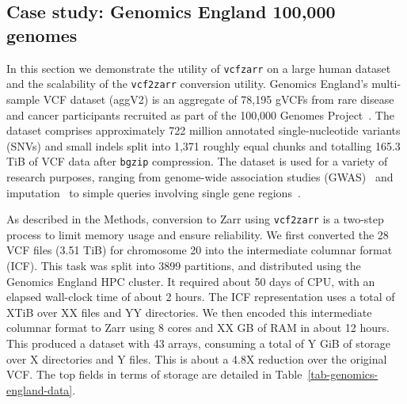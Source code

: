 \documentclass[a4paper,num-refs]{oup-contemporary}
\begin{document}
\subsection{Case study: Genomics England 100,000 genomes}
In this section we demonstrate the utility of \texttt{vcfzarr} on a large human dataset
and the scalability of the \texttt{vcf2zarr} conversion utility.
Genomics England’s multi-sample VCF dataset (aggV2) is an 
aggregate of 78,195 gVCFs from rare disease and cancer participants 
recruited as part of the 100,000 Genomes Project~\cite{turnbull2018100}. 
The dataset comprises approximately 722 million annotated single-nucleotide 
variants (SNVs) and small indels split into 1,371 roughly equal chunks and 
totalling 165.3 TiB of VCF data after \texttt{bgzip} compression. 
The dataset is used for a variety of research purposes, ranging from 
genome-wide association studies (GWAS)~\cite{kousathanas2022whole} and 
imputation~\cite{shi2023genomics} to 
simple queries involving single gene 
regions~\cite{leggatt2023genotype,lam2023repeat}.

As described in the Methods, conversion to Zarr using 
\texttt{vcf2zarr} is a two-step 
process to limit memory usage and ensure reliability. We 
first converted the 28 VCF files (3.51 TiB) for chromosome 20
into the intermediate columnar format (ICF). This task was 
split into 3899 partitions, and distributed using the Genomics England
HPC cluster. It required about 50 days of CPU, with an elapsed
wall-clock time of about 2 hours. The ICF representation uses a total
of XTiB over XX files and YY directories. We then encoded this intermediate
columnar format to Zarr using 8 cores and XX GB of RAM in about 12 hours.
This produced a dataset with 43 arrays, consuming a 
total of Y GiB of storage over X directories and 
Y files. This is about a 4.8X reduction over the original VCF. 
The top fields in terms 
of storage are detailed in Table~\ref{tab-genomics-england-data}.
\end{document}
